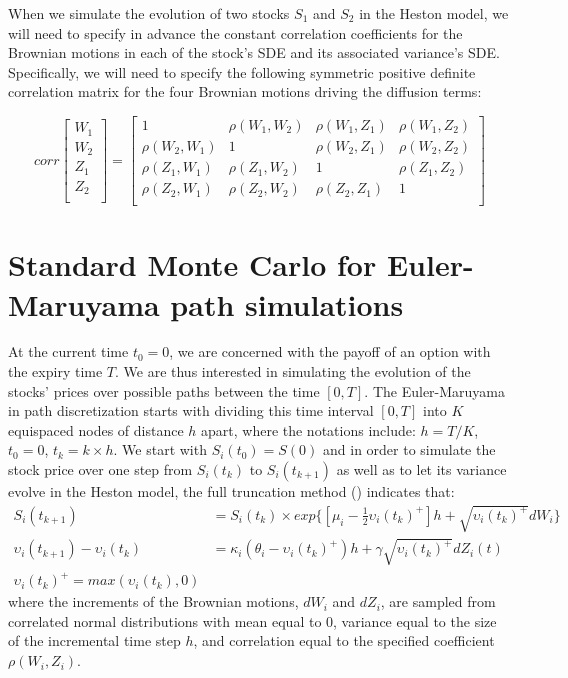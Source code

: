 \documentclass{article}
\begin{document}
	When we simulate the evolution of two stocks $S_1$ and $S_2$ in the Heston model, we will need to specify in advance the constant correlation coefficients for the Brownian motions in each of the stock's SDE and its associated variance's SDE. Specifically, we will need to specify the following symmetric positive definite correlation matrix for the four Brownian motions driving the diffusion terms:
	
	\begin{equation}
	corr
	\begin{bmatrix} 
	W_1  \\
	W_2  \\
	Z_1  \\
	Z_2  \\
	\end{bmatrix}
	=
	\begin{bmatrix} 
	1 & \rho(W_1,W_2) & \rho(W_1,Z_1) & \rho(W_1,Z_2) \\
	\rho(W_2,W_1) & 1 & \rho(W_2,Z_1) & \rho(W_2,Z_2) \\
	\rho(Z_1,W_1) & \rho(Z_1,W_2) & 1 & \rho(Z_1,Z_2) \\
	\rho(Z_2,W_1) & \rho(Z_2,W_2) & \rho(Z_2,Z_1) & 1 \\
	\end{bmatrix}
	\end{equation}
	
\section{Standard Monte Carlo for Euler-Maruyama path simulations}
	At the current time $t_0=0$, we are concerned with the payoff of an option with the expiry time $T$. We are thus interested in simulating the evolution of the stocks' prices over possible paths between the time $[0,T]$. The Euler-Maruyama in path discretization starts with dividing this time interval $[0,T]$ into $K$ equispaced nodes of distance $h$ apart, where the notations include: $h = T/K$, $t_0=0$, $t_k=k \times h$. We start with $S_i(t_0)=S(0)$ and in order to simulate the stock price over one step from $S_i(t_k)$ to $S_i(t_{k+1})$ as well as to let its variance evolve in the Heston model, the full truncation method (\cite{andersen07}) indicates that:
	\begin{align}
	S_i(t_{k+1}) &= S_i(t_k) \times exp\{[\mu_i - \frac{1}{2} \upsilon_i(t_k)^+] h + \sqrt{\upsilon_i(t_k)^+} dW_i \} \\
		
	\upsilon_i(t_{k+1}) - \upsilon_i(t_k) &= \kappa_i (\theta_i - \upsilon_i(t_k)^+) h + \gamma \sqrt{\upsilon_i(t_k)^+} dZ_i(t) \\
	
	\upsilon_i(t_k)^+ = max(\upsilon_i(t_k),0)
	\end{align}
	where the increments of the Brownian motions, $dW_i$ and $dZ_i$, are sampled from correlated normal distributions with mean equal to 0, variance equal to the size of the incremental time step $h$, and correlation equal to the specified coefficient $\rho(W_i,Z_i)$. 
	
\end{document}
